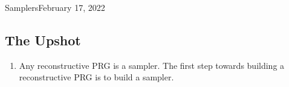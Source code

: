 \begin{lecture}{5}{Samplers}{February 17, 2022}\label{lec:05}

\subsection*{The Upshot}

\begin{enumerate}
  \item Any reconstructive PRG is a sampler. The first step towards building a
    reconstructive PRG is to build a sampler.
\end{enumerate}

\end{lecture}

